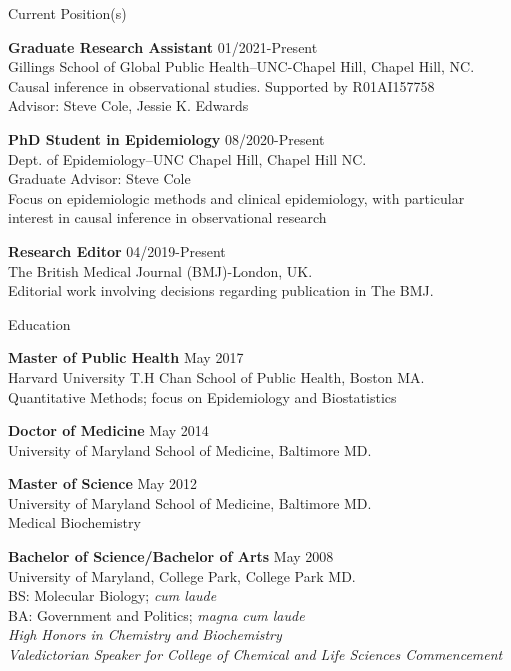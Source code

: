 \documentclass{resume} %
\begin{document}
\begin{rSection}{Current Position(s)}

{\bf Graduate Research Assistant} \hfill {01/2021-Present}
\\ 
Gillings School of Global Public Health--UNC-Chapel Hill, Chapel Hill, NC. 
\\
Causal inference in observational studies. Supported by R01AI157758\\
Advisor: Steve Cole, Jessie K. Edwards

{\bf PhD Student in Epidemiology} \hfill {08/2020-Present}
\\ 
Dept. of Epidemiology--UNC Chapel Hill, Chapel Hill NC. 
\\
Graduate Advisor: Steve Cole\\
Focus on epidemiologic methods and clinical epidemiology, with particular interest in causal inference in observational research

{\bf Research Editor } \hfill {04/2019-Present}
\\ 
The British Medical Journal (BMJ)-London, UK. 
\\
Editorial work involving decisions regarding publication in The BMJ.  

\end{rSection}

\begin{rSection}{Education}

{\bf Master of Public Health} \hfill {May 2017}
\\ 
Harvard University T.H Chan School of Public Health, Boston MA. 
\\
Quantitative Methods; focus on Epidemiology and Biostatistics  

{\bf Doctor of Medicine} \hfill {May 2014}
\\ 
University of Maryland School of Medicine, Baltimore MD.

{\bf Master of Science} \hfill {May 2012}
\\ 
University of Maryland School of Medicine, Baltimore MD.
\\
Medical Biochemistry

{\bf Bachelor of Science/Bachelor of Arts} \hfill {May 2008}
\\ 
University of Maryland, College Park, College Park MD.
\\
BS: Molecular Biology; \textit{cum laude}\\
BA: Government and Politics; \textit{magna cum laude}\\
\textit{High Honors in Chemistry and Biochemistry}\\
\textit{Valedictorian Speaker for College of Chemical and Life Sciences Commencement}

\end{rSection}
\pagebreak
\end{document}
